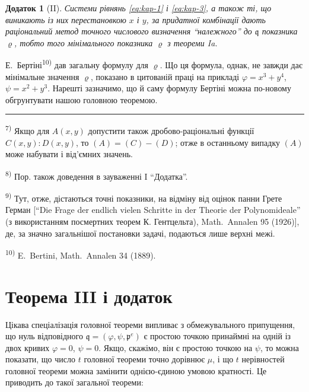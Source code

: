 \documentclass[11pt]{article}
\newcommand{\foreign}[1]{#1}
\theoremstyle{plain}
\newtheorem{zusatz}{Додаток}
\begin{document}
\begin{zusatz}[II]
Системи рівнянь \eqref{eq:kap-1} і \eqref{eq:kap-3}, а також ті, що
виникають із них перестановкою $x$ і $y$, за придатної комбінації
дають раціональний метод точного числового визначення ``належного''
до $\mathfrak{q}$ показника $\varrho$, тобто того мінімального
показника $\varrho$ з теореми Ia.
\end{zusatz}

Е.\ Бертіні\textsuperscript{10)} дав загальну формулу для $\varrho$.
Що ця формула, однак, не завжди дає мінімальне значення $\varrho$,
показано в цитованій праці на прикладі
$\varphi = x^{3} + y^{4}$, $\psi = x^{2} + y^{3}$. Нарешті зазначимо,
що й саму формулу Бертіні можна по-новому обгрунтувати нашою
головною теоремою.

\vspace{0.5em}
\noindent\rule{\textwidth}{0.4pt}
\vspace{0.3em}

{\footnotesize
\textsuperscript{7)} Якщо для $A(x,y)$ допустити також дробово-раціональні
функції $C(x,y):D(x,y)$, то $(A) = (C) - (D)$; отже в останньому
випадку $(A)$ може набувати і від'ємних значень.

\textsuperscript{8)} Пор. також доведення в зауваженні I ``Додатка''.

\textsuperscript{9)} Тут, отже, дістаються точні показники, на відміну від
оцінок панни Грете Герман [``Die Frage der endlich vielen Schritte
in der Theorie der Polynomideale'' (з використанням посмертних
теорем К. Гентцельта), \foreign{Math.\ Annalen} 95 (1926)], де, за
значно загальнішої постановки задачі, подаються лише верхні межі.

\textsuperscript{10)} E.\ Bertini, \foreign{Math.\ Annalen} 34 (1889).
}

\newpage
\section*{Теорема III і додаток}

Цікава спеціалізація головної теореми випливає з обмежувального
припущення, що нуль відповідного
$\mathfrak{q} = (\varphi, \psi, \mathfrak{p}^{e})$ є простою
точкою принаймні на одній із двох кривих $\varphi = 0$, $\psi = 0$.
Якщо, скажімо, він є простою точкою на $\psi$, то можна показати,
що число $t$ головної теореми точно дорівнює $\mu$, і що $t$
нерівностей головної теореми можна замінити однією-єдиною умовою
кратності. Це приводить до такої загальної теореми:
\end{document}
